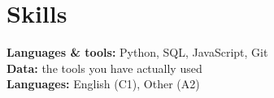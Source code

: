 \documentclass[a4paper,10pt]{article}
\begin{document}
\section{Skills}
\textbf{Languages \& tools:} Python, SQL, JavaScript, Git \\
\textbf{Data:} the tools you have actually used \\
\textbf{Languages:} English (C1), Other (A2) \hfill
\end{document}
